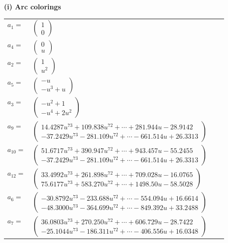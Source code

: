 \documentclass[1p]{elsarticle_modified}
\theoremstyle{definition}
\begin{document}
\flushleft \textbf{(i) Arc colorings}\\
\begin{tabular}{m{7pt} m{180pt} m{7pt} m{180pt} }
\flushright $a_{1}=$&$\begin{pmatrix}1\\0\end{pmatrix}$ \\
\flushright $a_{4}=$&$\begin{pmatrix}0\\u\end{pmatrix}$ \\
\flushright $a_{2}=$&$\begin{pmatrix}1\\u^2\end{pmatrix}$ \\
\flushright $a_{5}=$&$\begin{pmatrix}- u\\- u^3+u\end{pmatrix}$ \\
\flushright $a_{3}=$&$\begin{pmatrix}- u^2+1\\- u^4+2 u^2\end{pmatrix}$ \\
\flushright $a_{9}=$&$\begin{pmatrix}14.4287 u^{73}+109.838 u^{72}+\cdots+281.944 u-28.9142\\-37.2429 u^{73}-281.109 u^{72}+\cdots-661.514 u+26.3313\end{pmatrix}$ \\
\flushright $a_{10}=$&$\begin{pmatrix}51.6717 u^{73}+390.947 u^{72}+\cdots+943.457 u-55.2455\\-37.2429 u^{73}-281.109 u^{72}+\cdots-661.514 u+26.3313\end{pmatrix}$ \\
\flushright $a_{12}=$&$\begin{pmatrix}33.4992 u^{73}+261.898 u^{72}+\cdots+709.028 u-16.0765\\75.6177 u^{73}+583.270 u^{72}+\cdots+1498.50 u-58.5028\end{pmatrix}$ \\
\flushright $a_{6}=$&$\begin{pmatrix}-30.8792 u^{73}-233.688 u^{72}+\cdots-554.094 u+16.6614\\-48.3000 u^{73}-364.699 u^{72}+\cdots-849.392 u+33.2488\end{pmatrix}$ \\
\flushright $a_{7}=$&$\begin{pmatrix}36.0803 u^{73}+270.250 u^{72}+\cdots+606.729 u-28.7422\\-25.1044 u^{73}-186.311 u^{72}+\cdots-406.556 u+16.0348\end{pmatrix}$ \\

\end{tabular}
\end{document}
